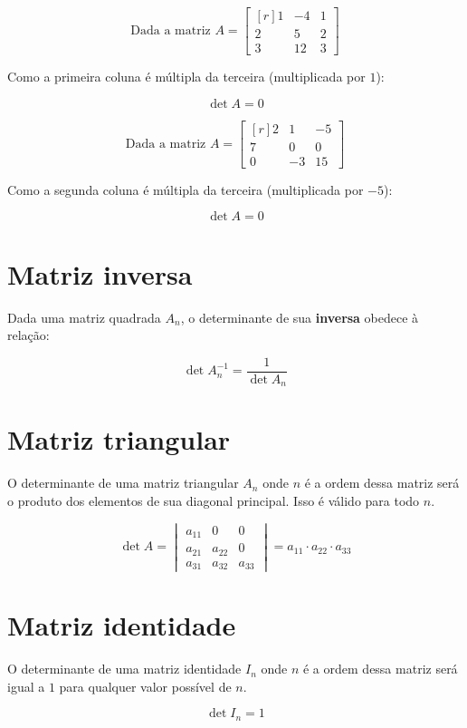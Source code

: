 \Example
$$
\text{Dada a matriz }A=\begin{bmatrix*}[r]
1 & -4 & 1\\
2 & 5 & 2\\
3 & 12 & 3
\end{bmatrix*}
$$

Como a primeira coluna é múltipla da terceira (multiplicada por $1$):

$$
\det A=0
$$

\Example
$$
\text{Dada a matriz }A=\begin{bmatrix*}[r]
2 & 1 & -5\\
7 & 0 & 0\\
0 & -3 & 15
\end{bmatrix*}
$$

Como a segunda coluna é múltipla da terceira (multiplicada por $-5$):

$$
\det A=0
$$

\section{Matriz inversa}
Dada uma matriz quadrada $A_n$, o determinante de sua \textbf{inversa} obedece à relação:

$$
\det A_n^{-1}=\frac{1}{\det A_n}
$$

\section{Matriz triangular}

O determinante de uma matriz triangular $A_n$ onde $n$ é a ordem dessa matriz será o produto dos elementos de sua diagonal principal. Isso é válido para todo $n$.

\Example

$$
\det A=\begin{vmatrix}
a_{11} & 0 & 0\\
a_{21} & a_{22} & 0\\
a_{31} & a_{32} & a_{33}
\end{vmatrix}= a_{11} \cdot a_{22} \cdot a_{33}
$$

\section{Matriz identidade}

O determinante de uma matriz identidade $I_n$ onde $n$ é a ordem dessa matriz será igual a $1$ para qualquer valor possível de $n$.

$$
\det I_n=1
$$

